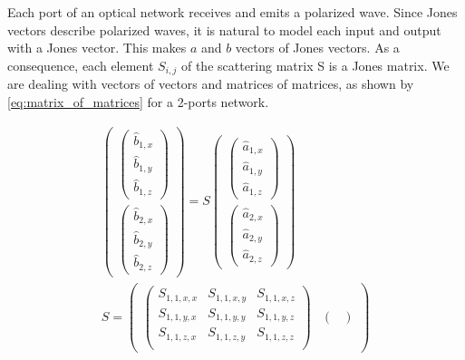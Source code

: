 Each port of an optical network receives and emits a polarized wave.
Since Jones vectors describe polarized waves, it is natural to model each input and output with a Jones vector.
This makes $a$ and $b$ vectors of Jones vectors.
As a consequence, each element $S_{i, j}$ of the scattering matrix S is a Jones matrix.
We are dealing with vectors of vectors and matrices of matrices, as shown by \cref{eq:matrix_of_matrices} for a 2-ports network.

\begin{equation}
    \begin{gathered}
    \begin{pmatrix}
        \begin{pmatrix}
            \hat{b}_{1, x} \\ \hat{b}_{1, y} \\ \hat{b}_{1, z}
        \end{pmatrix}
        \\
        \begin{pmatrix}
            \hat{b}_{2, x} \\ \hat{b}_{2, y} \\ \hat{b}_{2, z}
        \end{pmatrix}
    \end{pmatrix}
    =
    S
    \begin{pmatrix}
        \begin{pmatrix}
            \hat{a}_{1, x} \\ \hat{a}_{1, y} \\ \hat{a}_{1, z}
        \end{pmatrix}
        \\
        \begin{pmatrix}
            \hat{a}_{2, x} \\ \hat{a}_{2, y} \\ \hat{a}_{2, z}
        \end{pmatrix}
    \end{pmatrix}
    \\
    S =
    \begin{pmatrix}
        \begin{pmatrix}
            S_{1, 1, x, x} & S_{1, 1, x, y} & S_{1, 1, x, z} \\
            S_{1, 1, y, x} & S_{1, 1, y, y} & S_{1, 1, y, z} \\
            S_{1, 1, z, x} & S_{1, 1, z, y} & S_{1, 1, z, z} \\
        \end{pmatrix}
        &
        \begin{pmatrix}

\end{pmatrix}
\end{pmatrix}
\end{gathered}
\end{equation}
